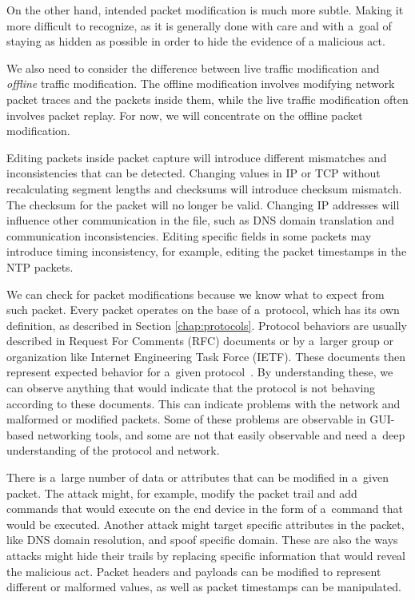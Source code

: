 \documentclass[
  printed,     %
  color,       %
  oneside,     %
  nosansbold,  %
  nocolorbold, %
  nolof,         %
  nolot,         %
]{fithesis4}
\begin{document}
On the other hand, intended packet modification is much more subtle. Making it more difficult to recognize, as it is generally done with care and with a~goal of staying as hidden as possible in order to hide the evidence of a malicious act.

We also need to consider the difference between live traffic modification and \textit{offline} traffic modification. The offline modification involves modifying network packet traces and the packets inside them, while the live traffic modification often involves packet replay. For now, we will concentrate on the offline packet modification.

Editing packets inside packet capture will introduce different mismatches and inconsistencies that can be detected. Changing values in IP or TCP without recalculating segment lengths and checksums will introduce checksum mismatch. The checksum for the packet will no longer be valid. Changing IP addresses will influence other communication in the file, such as DNS domain translation and communication inconsistencies. Editing specific fields in some packets may introduce timing inconsistency, for example, editing the packet timestamps in the NTP packets. 

We can check for packet modifications because we know what to expect from such packet. Every packet operates on the base of a~protocol, which has its own definition, as described in Section \ref{chap:protocols}. Protocol behaviors are usually described in Request For Comments (RFC) documents or by a~larger group or organization like Internet Engineering Task Force (IETF). These documents then represent expected behavior for a~given protocol~\cite{Messier2017-fz}. By understanding these, we can observe anything that would indicate that the protocol is not behaving according to these documents. This can indicate problems with the network and malformed or modified packets. Some of these problems are observable in GUI-based networking tools, and some are not that easily observable and need a~deep understanding of the protocol and network. 

There is a~large number of data or attributes that can be modified in a~given packet. The attack might, for example, modify the packet trail and add commands that would execute on the end device in the form of a~command that would be executed. Another attack might target specific attributes in the packet, like DNS domain resolution, and spoof specific domain. These are also the ways attacks might hide their trails by replacing specific information that would reveal the malicious act. Packet headers and payloads can be modified to represent different or malformed values, as well as packet timestamps can be manipulated.
\end{document}
